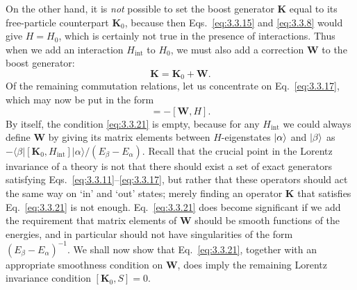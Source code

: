 On the other hand, it is \textit{not} possible to set the boost generator
$\mathbf{K}$ equal to its free-particle counterpart $\mathbf{K}_0$, because then
Eqs.~\eqref{eq:3.3.15} and \eqref{eq:3.3.8} would give $H=H_0$, which is certainly not true in the
presence of interactions. Thus when we add an interaction $H_{\mathrm{int}}$ to
$H_0$, we must also add a correction $\mathbf{W}$ to the boost generator:
\begin{equation}
\mathbf{K}=\mathbf{K}_0+\mathbf{W}.
\tag{3.3.20}\label{eq:3.3.20}
\end{equation}
Of the remaining commutation relations, let us concentrate on Eq.~\eqref{eq:3.3.17}, which
may now be put in the form
\begin{equation}
[\mathbf{K}_0,H_{\mathrm{int}}]=-[\mathbf{W},H].
\tag{3.3.21}\label{eq:3.3.21}
\end{equation}
By itself, the condition \eqref{eq:3.3.21} is empty, because for any $H_{\mathrm{int}}$ we
could always define $\mathbf{W}$ by giving its matrix elements between
$H$-eigenstates $\lvert \alpha\rangle$ and $\lvert \beta\rangle$ as
$-\langle\beta\vert[\mathbf{K}_0,H_{\mathrm{int}}]\vert\alpha\rangle/
(E_\beta-E_\alpha)$. Recall that the crucial point in the Lorentz invariance of a
theory is not that there should exist a set of exact generators satisfying
Eqs.~\eqref{eq:3.3.11}--\eqref{eq:3.3.17}, but rather that these operators should act the same way on
`in' and `out' states; merely finding an operator $\mathbf{K}$ that satisfies
Eq.~\eqref{eq:3.3.21} is not enough. Eq.~\eqref{eq:3.3.21} does become significant if we add the
requirement that matrix elements of $\mathbf{W}$ should be smooth functions of the
energies, and in particular should not have singularities of the form
$(E_\beta-E_\alpha)^{-1}$. We shall now show that Eq.~\eqref{eq:3.3.21}, together with an
appropriate smoothness condition on $\mathbf{W}$, does imply the remaining Lorentz
invariance condition $[\mathbf{K}_0,S]=0$.

